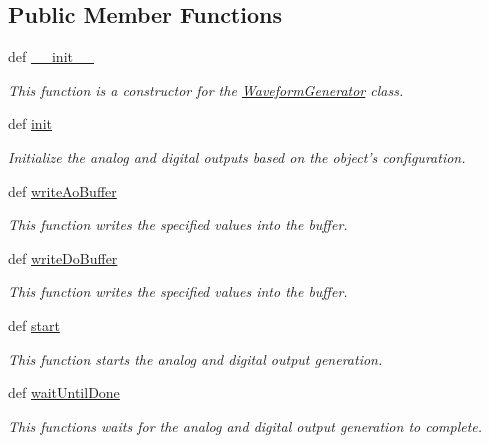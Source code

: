 \subsection*{Public Member Functions}
\begin{DoxyCompactItemize}
\item 
def \hyperlink{class_waveform_generator_1_1_waveform_generator_ac7bfc889aae76cae59cfa7de873c3d61}{\-\_\-\-\_\-init\-\_\-\-\_\-}
\begin{DoxyCompactList}\small\item\em This function is a constructor for the \hyperlink{class_waveform_generator_1_1_waveform_generator}{Waveform\-Generator} class. \end{DoxyCompactList}\item 
def \hyperlink{class_waveform_generator_1_1_waveform_generator_a089791e1214bb1342396bef13fcc8a03}{init}
\begin{DoxyCompactList}\small\item\em Initialize the analog and digital outputs based on the object's configuration. \end{DoxyCompactList}\item 
def \hyperlink{class_waveform_generator_1_1_waveform_generator_a9fb983f2822da6a010133da8cf2995f9}{write\-Ao\-Buffer}
\begin{DoxyCompactList}\small\item\em This function writes the specified values into the buffer. \end{DoxyCompactList}\item 
def \hyperlink{class_waveform_generator_1_1_waveform_generator_afeb3e4ca2b30fc3fc4e6e7325ffd9d9f}{write\-Do\-Buffer}
\begin{DoxyCompactList}\small\item\em This function writes the specified values into the buffer. \end{DoxyCompactList}\item 
def \hyperlink{class_waveform_generator_1_1_waveform_generator_a9f7e4db3cb5550802a268ce6a8cb2fb5}{start}
\begin{DoxyCompactList}\small\item\em This function starts the analog and digital output generation. \end{DoxyCompactList}\item 
def \hyperlink{class_waveform_generator_1_1_waveform_generator_ac3cf6e28382592a1f05be72f96d9785f}{wait\-Until\-Done}
\begin{DoxyCompactList}\small\item\em This functions waits for the analog and digital output generation to complete. \end{DoxyCompactList}\item 

\end{DoxyCompactItemize}
